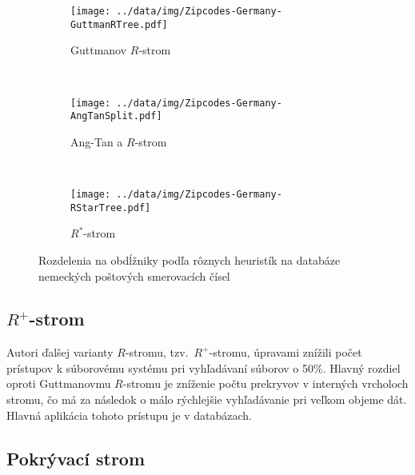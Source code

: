 \documentclass[10pt,a4paper,oneside]{article}
\begin{document}
{\begin{figure}
        \centering
        \begin{subfigure}[b]{0.3\textwidth}
                \texttt{[image: ../data/img/Zipcodes-Germany-GuttmanRTree.pdf]}
                \caption{Guttmanov $R$-strom \citep{RTreeSplitImg}}
                \label{fig:RTreeSplit}
        \end{subfigure}
        ~ %
        \begin{subfigure}[b]{0.31\textwidth}
                \texttt{[image: ../data/img/Zipcodes-Germany-AngTanSplit.pdf]}
                \caption{Ang-Tan \citep{ang97} a $R$-strom \citep{AngTanSplitImg}}
                \label{fig:AngTanSplit}
        \end{subfigure}
        ~ %
        \begin{subfigure}[b]{0.3\textwidth}
                \texttt{[image: ../data/img/Zipcodes-Germany-RStarTree.pdf]}
                \caption{$R^*$-strom \citep{RStarTreeSplitImg}}
                \label{fig:RStarTreeSplit}
        \end{subfigure}%
        \caption{Rozdelenia na obdĺžniky podľa rôznych heuristík na databáze nemeckých poštových smerovacích čísel}\label{fig:Splits}
\end{figure}

\FloatBarrier

\subsection{$R^+$-strom}\label{rplustree}

Autori \citet{Sellis87} ďalšej varianty $R$-stromu, tzv.~$R^+$-stromu, úpravami znížili počet prístupov k súborovému systému pri vyhľadávaní súborov o 50\%. Hlavný rozdiel oproti Guttmanovmu $R$-stromu je zníženie počtu prekryvov v interných vrcholoch stromu, čo má za následok o málo rýchlejšie vyhľadávanie pri veľkom objeme dát. Hlavná aplikácia tohoto prístupu je v databázach.

\subsection{Pokrývací strom}\label{covertree}

}
\end{document}

